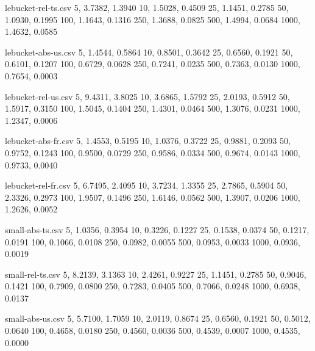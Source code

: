 \begin{filecontents*}[overwrite]{lebucket-rel-ts.csv}
5,    3.7382, 1.3940
10,   1.5028, 0.4509
25,   1.1451, 0.2785
50,   1.0930, 0.1995
100,  1.1643, 0.1316
250,  1.3688, 0.0825
500,  1.4994, 0.0684
1000, 1.4632, 0.0585
\end{filecontents*}

\begin{filecontents*}[overwrite]{lebucket-abs-us.csv}
5,    1.4544, 0.5864
10,   0.8501, 0.3642
25,   0.6560, 0.1921
50,   0.6101, 0.1207
100,  0.6729, 0.0628
250,  0.7241, 0.0235
500,  0.7363, 0.0130
1000, 0.7654, 0.0003
\end{filecontents*}

\begin{filecontents*}[overwrite]{lebucket-rel-us.csv}
5,    9.4311, 3.8025
10,   3.6865, 1.5792
25,   2.0193, 0.5912
50,   1.5917, 0.3150
100,  1.5045, 0.1404
250,  1.4301, 0.0464
500,  1.3076, 0.0231
1000, 1.2347, 0.0006
\end{filecontents*}

\begin{filecontents*}[overwrite]{lebucket-abs-fr.csv}
5,    1.4553, 0.5195
10,   1.0376, 0.3722
25,   0.9881, 0.2093
50,   0.9752, 0.1243
100,  0.9500, 0.0729
250,  0.9586, 0.0334
500,  0.9674, 0.0143
1000, 0.9733, 0.0040
\end{filecontents*}

\begin{filecontents*}[overwrite]{lebucket-rel-fr.csv}
5,    6.7495, 2.4095
10,   3.7234, 1.3355
25,   2.7865, 0.5904
50,   2.3326, 0.2973
100,  1.9507, 0.1496
250,  1.6146, 0.0562
500,  1.3907, 0.0206
1000, 1.2626, 0.0052
\end{filecontents*}


\begin{filecontents*}[overwrite]{small-abs-ts.csv}
5,    1.0356, 0.3954
10,   0.3226, 0.1227
25,   0.1538, 0.0374
50,   0.1217, 0.0191
100,  0.1066, 0.0108
250,  0.0982, 0.0055
500,  0.0953, 0.0033
1000, 0.0936, 0.0019
\end{filecontents*}

\begin{filecontents*}[overwrite]{small-rel-ts.csv}
5,    8.2139, 3.1363
10,   2.4261, 0.9227
25,   1.1451, 0.2785
50,   0.9046, 0.1421
100,  0.7909, 0.0800
250,  0.7283, 0.0405
500,  0.7066, 0.0248
1000, 0.6938, 0.0137
\end{filecontents*}

\begin{filecontents*}[overwrite]{small-abs-us.csv}
5,    5.7100, 1.7059
10,   2.0119, 0.8674
25,   0.6560, 0.1921
50,   0.5012, 0.0640
100,  0.4658, 0.0180
250,  0.4560, 0.0036
500,  0.4539, 0.0007
1000, 0.4535, 0.0000
\end{filecontents*}

